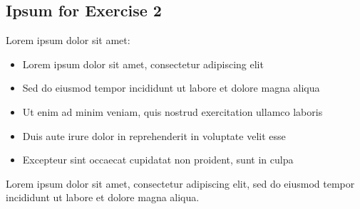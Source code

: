 \subsection*{Ipsum for Exercise 2}
Lorem ipsum dolor sit amet:
\begin{itemize}[noitemsep, topsep=0pt]
	\item Lorem ipsum dolor sit amet, consectetur adipiscing elit
	\item Sed do eiusmod tempor incididunt ut labore et dolore magna aliqua
	\item Ut enim ad minim veniam, quis nostrud exercitation ullamco laboris
	\item Duis aute irure dolor in reprehenderit in voluptate velit esse
	\item Excepteur sint occaecat cupidatat non proident, sunt in culpa
\end{itemize}

Lorem ipsum dolor sit amet, consectetur adipiscing elit, sed do eiusmod tempor incididunt ut labore et dolore magna aliqua.